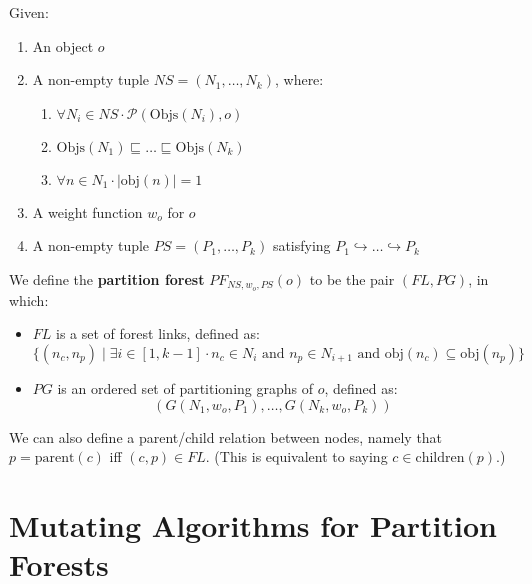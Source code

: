 \begin{definition}
Given:

\begin{enumerate}

\item An object $o$
\item A non-empty tuple $\textit{NS} = (N_1,\ldots,N_k)$, where:

\begin{enumerate}

\item $\forall N_i \in \textit{NS} \cdot \mathcal{P}(\mbox{Objs}(N_i),o)$
\item $\mbox{Objs}(N_1) \sqsubseteq \ldots \sqsubseteq \mbox{Objs}(N_k)$ 
\item $\forall n \in N_1 \cdot |\mbox{obj}(n)| = 1$

\end{enumerate}

\item A weight function $w_o$ for $o$
\item A non-empty tuple $\textit{PS} = (P_1,\ldots,P_k)$ satisfying $P_1 \hookrightarrow \ldots \hookrightarrow P_k$

\end{enumerate}

\noindent We define the \textbf{partition forest} $PF_{\textit{NS},w_o,\textit{PS}}(o)$ to be the pair $(\textit{FL},\textit{PG})$, in which:

\begin{itemize}

\item $\textit{FL}$ is a set of forest links, defined as:
%
\[
\{(n_c,n_p) \; | \; \exists i \in [1,k-1] \cdot n_c \in N_i \mbox { and } n_p \in N_{i+1} \mbox{ and } \mbox{obj}(n_c) \subseteq \mbox{obj}(n_p)\}
\]

\item $\textit{PG}$ is an ordered set of partitioning graphs of $o$, defined as:
%
\[
(G(N_1,w_o,P_1),\ldots,G(N_k,w_o,P_k))
\]

\end{itemize}

\end{definition}

\noindent We can also define a parent/child relation between nodes, namely that $p = \mbox{parent}(c)$ iff $(c,p) \in \textit{FL}$. (This is equivalent to saying $c \in \mbox{children}(p)$.)

\section{Mutating Algorithms for Partition Forests}

